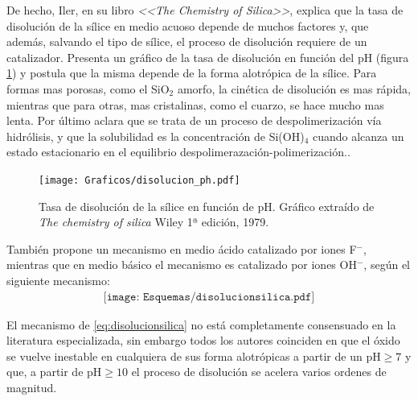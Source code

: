 	De hecho, Iler, en su libro \textit{<<The Chemistry of Silica>>}, explica que la tasa de disolución de la sílice en medio acuoso depende de muchos factores y, que además, salvando el tipo de sílice, el proceso de disolución requiere de un catalizador. Presenta un gráfico de la tasa de disolución en función del pH (figura \ref{fig:disolucion_ph}) y postula que la misma depende de la forma alotrópica de la sílice. Para formas mas porosas, como el SiO$_2$ amorfo, la cinética de disolución es mas rápida, mientras que para otras, mas cristalinas, como el cuarzo, se hace mucho mas lenta. Por último aclara que se trata de un proceso de despolimerización vía hidrólisis, y que la solubilidad es la concentración de Si(OH)$_4$ cuando alcanza un estado estacionario en el equilibrio despolimerazación-polimerización.\cite{iler1979}. 

			\begin{figure}[th!]
			\centering
 	       	\texttt{[image: Graficos/disolucion\_ph.pdf]}
	       		\caption[Tasa de disolución sílice en función del pH]{Tasa de disolución de la sílice en función de pH. Gráfico extraído de \textit{The chemistry of silica} Wiley 1ª edición, 1979.\cite{iler1979}}
	         	\label{fig:disolucion_ph}
	     		\end{figure}
	
	También propone un mecanismo en medio ácido catalizado por iones F$^-$, mientras que en medio básico el mecanismo es catalizado por iones OH$^-$, según el siguiente mecanismo:
			\begin{equation}
				\begin{aligned}
				\texttt{[image: Esquemas/disolucionsilica.pdf]}
				\label{eq:disolucionsilica}
				\end{aligned}
				\end{equation} 
	
	El mecanismo de \ref{eq:disolucionsilica} no está completamente consensuado en la literatura especializada, sin embargo todos los autores coinciden en que el óxido se vuelve inestable en cualquiera de sus forma alotrópicas a partir de un $\text{pH}\geq7$ y que, a partir de $\text{pH}\geq10$ el proceso de disolución se acelera varios ordenes de magnitud.\cite{Kosmulski2002,Kosmulski2014,Schwarz1984,Si-HanWu2013,iler1979}

	
